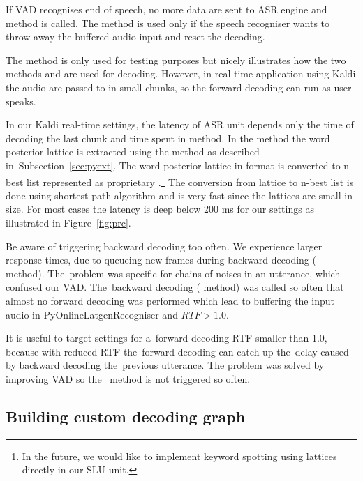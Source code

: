 If \ac{VAD} recognises end of speech, no more data are sent to \ac{ASR} engine and  method is called.
The  method is used only if the speech recogniser wants to throw away the buffered audio input and reset the decoding.


The method  is only used for testing purposes but nicely illustrates how the two methods  and  are used for decoding. However, in real-time application using Kaldi the audio are passed to  in small chunks, so the forward decoding can run as user speaks. 

In our Kaldi real-time settings, the latency of \ac{ASR} unit depends only the time of decoding the last chunk and time spent in  method.
In the  method the word posterior lattice is extracted using the  method as described in~Subsection~\ref{sec:pyext}. 
The word posterior lattice in  format is converted to n-best list represented as proprietary .\footnote{In the future, we would like to implement keyword spotting using lattices directly in our \ac{SLU} unit.}
The conversion from lattice to n-best list is done using  shortest path algorithm and is very fast since the lattices are small in size.
For most cases the latency is deep below 200 ms for our settings as illustrated in Figure~\ref{fig:prc}.


Be aware of triggering backward decoding too often. 
We experience larger response times, due to queueing new frames during backward decoding ( method).
The~problem was specific for chains of noises in an utterance, which confused our \acl{VAD}.
The~backward decoding ( method) was called so often that almost no forward decoding was performed which lead to buffering the input audio in \ac{PyOnlineLatgenRecogniser} and $RTF > 1.0$.

It is useful to target settings for a~forward decoding \ac{RTF} smaller than 1.0, because with reduced RTF the~forward decoding can catch up the~delay caused by backward decoding the~previous utterance.
The problem was solved by improving \ac{VAD} so the~ method is not triggered so often.

\subsection{Building custom decoding graph}
\label{sub:hclg}

